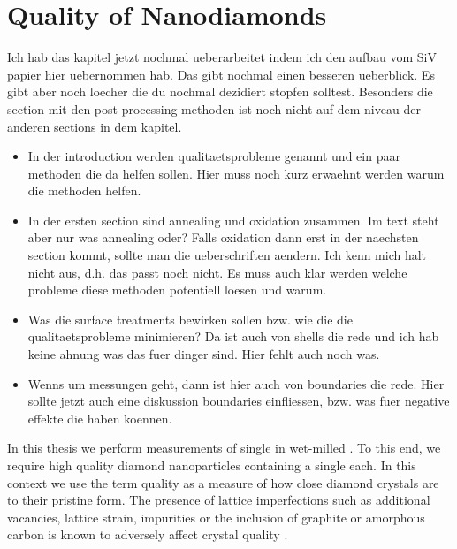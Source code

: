 
\chapter{Quality of Nanodiamonds}	\label{ch::crystal_quality}

		\begin{remark}
				Ich hab das kapitel jetzt nochmal ueberarbeitet indem ich den aufbau vom SiV papier hier uebernommen hab. Das gibt nochmal einen besseren ueberblick. Es gibt aber noch loecher die du nochmal dezidiert stopfen solltest. Besonders die section mit den post-processing methoden ist noch nicht auf dem niveau der anderen sections in dem kapitel.

				\begin{itemize}
					\item In der introduction werden qualitaetsprobleme genannt und ein paar methoden die da helfen sollen. Hier muss noch kurz erwaehnt werden warum die methoden helfen.
					\item In der ersten section sind annealing und oxidation zusammen. Im text steht aber nur was annealing oder? Falls oxidation dann erst in der naechsten section kommt, sollte man die ueberschriften aendern. Ich kenn mich halt nicht aus, d.h. das passt noch nicht. Es muss auch klar werden welche probleme diese methoden potentiell loesen und warum.
					\item Was die surface treatments bewirken sollen bzw. wie die die qualitaetsprobleme minimieren? Da ist auch von shells die rede und ich hab keine ahnung was das fuer dinger sind. Hier fehlt auch noch was.
					\item Wenns um \TEM messungen geht, dann ist hier auch von \nd boundaries die rede. Hier sollte jetzt auch eine diskussion boundaries einfliessen, bzw. was fuer negative effekte die haben koennen.
				\end{itemize}

		\end{remark}

		In this thesis we perform measurements of single \sivs in wet-milled \nds. To this end, we require high quality diamond nanoparticles containing a single \siv each. In this context we use the term quality as a measure of how close diamond crystals are to their pristine form. The presence of lattice imperfections such as additional vacancies, lattice strain, impurities or the inclusion of graphite or amorphous carbon is known to adversely affect crystal quality \cite{Zaitsev2001,Prawer2004,Orwa2000}.

